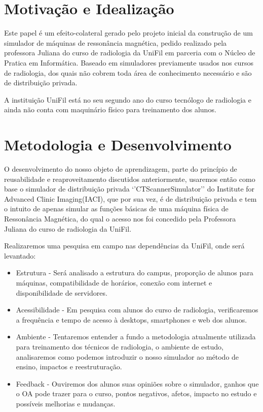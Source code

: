 \documentclass[12pt,openright,oneside,a4paper,english,french,spanish,brazil]{unifil}
\begin{document}
\chapter{Motivação e Idealização}%

Este papel é um efeito-colateral gerado pelo projeto inicial da construção de um simulador de máquinas de ressonância magnética, pedido realizado pela professora Juliana do curso de radiologia da UniFil em parceria com o Núcleo de Pratica em Informática. Baseado em simuladores previamente usados nos cursos de radiologia, dos quais não cobrem toda área de conhecimento necessário e são de distribuição privada.

A instituição UniFil está no seu segundo ano do curso tecnólogo de radiologia e ainda não conta com maquinário físico para treinamento dos alunos.

\chapter {Metodologia e Desenvolvimento}
O desenvolvimento do nosso objeto de aprendizagem, parte do princípio de reusabilidade e reaproveitamento discutidos anteriormente, usaremos então como base o simulador de distribuição privada `'CTScannerSimulator'' do Institute for Advanced Clinic Imaging(IACI), que por sua vez, é de distribuição privada e tem o intuito de apenas simular as funções básicas de uma máquina física de Ressonância Magnética, do qual o acesso nos foi concedido pela Professora Juliana do curso de radiologia da UniFil.

Realizaremos uma pesquisa em campo nas dependências da UniFil, onde será levantado:
\begin{itemize}
\item Estrutura - Será analisado a estrutura do campus, proporção de alunos para máquinas, compatibilidade de horários, conexão com internet e disponibilidade de servidores.
\item Acessibilidade - Em pesquisa com alunos do curso de radiologia, verificaremos a frequência e tempo de acesso à desktops, smartphones e web dos alunos.
\item Ambiente - Tentaremos entender a fundo a metodologia atualmente utilizada para treinamento dos técnicos de radiologia, o ambiente de estudo, analisaremos como podemos introduzir o nosso simulador ao método de ensino, impactos e reestruturação.
\item Feedback - Ouviremos dos alunos suas opiniões sobre o simulador, ganhos que o OA pode trazer para o curso, pontos negativos, afetos, impacto no estudo e possíveis melhorias e mudanças.
\end{itemize}
\end{document}
